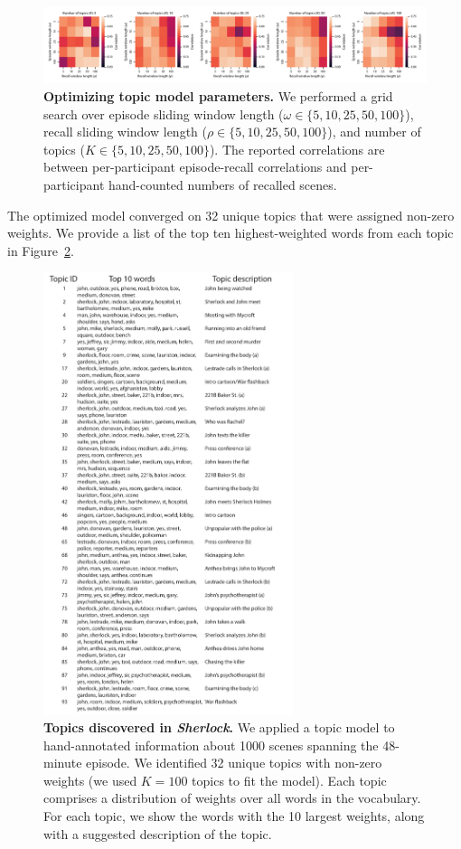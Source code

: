 \documentclass{article}
\begin{document}
\begin{figure}[b]
\centering
\includegraphics[width=1\textwidth]{figs/parameter_search}
\caption{\small \textbf{Optimizing topic model parameters.}  We performed a grid search over episode sliding window length ($\omega \in \{5, 10, 25, 50, 100 \}$), recall sliding window length ($\rho \in \{5, 10, 25, 50, 100 \}$), and number of topics ($K \in \{5, 10, 25, 50, 100 \}$).  The reported correlations are between per-participant episode-recall correlations and per-participant hand-counted numbers of recalled scenes.}
\label{fig:paramsearch}
\end{figure}

The optimized model converged on 32 unique topics that were assigned non-zero weights.  We provide a list of the top ten highest-weighted words from each topic in Figure~\ref{fig:topics}.

\begin{figure}[p]
\centering
\includegraphics[width=0.65\textwidth]{figs/topic_words}
\caption{\small \textbf{Topics discovered in \textit{Sherlock}.} We applied a topic model to hand-annotated information about 1000 scenes spanning the 48-minute episode.  We identified 32 unique topics with non-zero weights (we used $K=100$ topics to fit the model).  Each topic comprises a distribution of weights over all words in the vocabulary.  For each topic, we show the words with the 10 largest weights, along with a suggested description of the topic.}
\label{fig:topics}
\end{figure}
\end{document}
